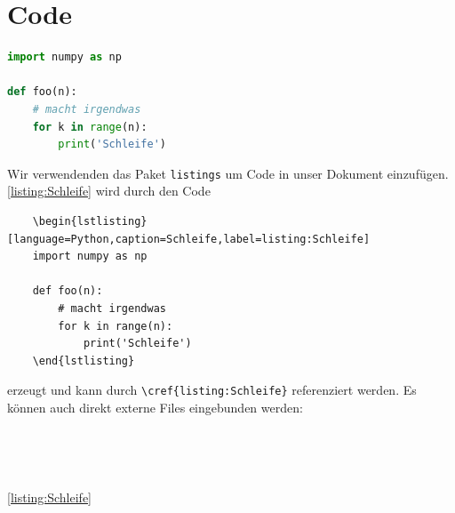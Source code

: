 \section{Code}
\begin{lstlisting}[language=Python,caption=Schleife,label=listing:Schleife]
import numpy as np

def foo(n):
    # macht irgendwas
    for k in range(n):
        print('Schleife')
\end{lstlisting}
Wir verwendenden das Paket \verb|listings| um Code in unser Dokument einzufügen.
\cref{listing:Schleife} wird durch den Code
\begin{verbatim}
    \begin{lstlisting}[language=Python,caption=Schleife,label=listing:Schleife]
    import numpy as np
    
    def foo(n):
        # macht irgendwas
        for k in range(n):
            print('Schleife')
    \end{lstlisting}
\end{verbatim}
erzeugt und kann durch \verb|\cref{listing:Schleife}| referenziert werden. Es können auch direkt externe Files eingebunden werden:
\begin{verbatim}
    
\end{verbatim}




 \\

\clearpage


\cref{listing:Schleife}
